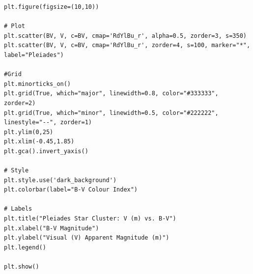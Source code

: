 \documentclass[12pt]{article}
\begin{document}
\begin{minipage}{\linewidth}
\captionsetup{hypcap=false}

\begin{mintedbox}
\begin{verbatim}
plt.figure(figsize=(10,10))

# Plot
plt.scatter(BV, V, c=BV, cmap='RdYlBu_r', alpha=0.5, zorder=3, s=350)
plt.scatter(BV, V, c=BV, cmap='RdYlBu_r', zorder=4, s=100, marker="*", label="Pleiades")

#Grid
plt.minorticks_on()
plt.grid(True, which="major", linewidth=0.8, color="#333333", zorder=2)
plt.grid(True, which="minor", linewidth=0.5, color="#222222", linestyle="--", zorder=1)
plt.ylim(0,25)
plt.xlim(-0.45,1.85)
plt.gca().invert_yaxis()

# Style
plt.style.use('dark_background')
plt.colorbar(label="B-V Colour Index")

# Labels
plt.title("Pleiades Star Cluster: V (m) vs. B-V")
plt.xlabel("B-V Magnitude")
plt.ylabel("Visual (V) Apparent Magnitude (m)")
plt.legend()

plt.show()

\end{verbatim}
\end{mintedbox}

\end{minipage}

%
\end{document}
